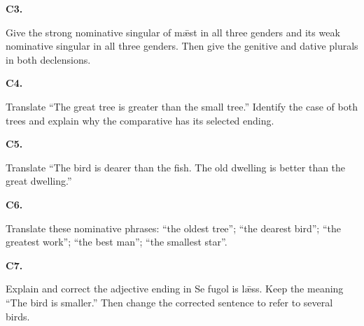 \par\begin{minipage}{\linewidth}\raggedright
\textbf{C3.}

Give the strong nominative singular of mǣst in all three genders and its weak nominative singular in all three genders. Then give the genitive and dative plurals in both declensions.

\end{minipage}\par\addvspace{4pt}

\par\begin{minipage}{\linewidth}\raggedright
\textbf{C4.}

Translate “The great tree is greater than the small tree.” Identify the case of both trees and explain why the comparative has its selected ending.

\end{minipage}\par\addvspace{4pt}

\par\begin{minipage}{\linewidth}\raggedright
\textbf{C5.}

Translate “The bird is dearer than the fish. The old dwelling is better than the great dwelling.”

\end{minipage}\par\addvspace{4pt}

\par\begin{minipage}{\linewidth}\raggedright
\textbf{C6.}

Translate these nominative phrases: “the oldest tree”; “the dearest bird”; “the greatest work”; “the best man”; “the smallest star”.

\end{minipage}\par\addvspace{4pt}

\par\begin{minipage}{\linewidth}\raggedright
\textbf{C7.}

Explain and correct the adjective ending in Se fugol is lǣss. Keep the meaning “The bird is smaller.” Then change the corrected sentence to refer to several birds.

\end{minipage}\par\addvspace{4pt}

